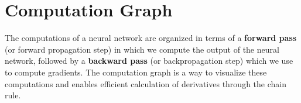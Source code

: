 \documentclass[11pt,a4paper]{article}
\theoremstyle{definition}
\theoremstyle{remark}
\begin{document}
\vspace{0.4cm}


\section{Computation Graph}

\begin{keyconcept}
The computations of a neural network are organized in terms of a \textbf{forward pass} (or forward propagation step) in which we compute the output of the neural network, followed by a \textbf{backward pass} (or backpropagation step) which we use to compute gradients. The computation graph is a way to visualize these computations and enables efficient calculation of derivatives through the chain rule.
\end{keyconcept}

\vspace{0.4cm}
\end{document}

